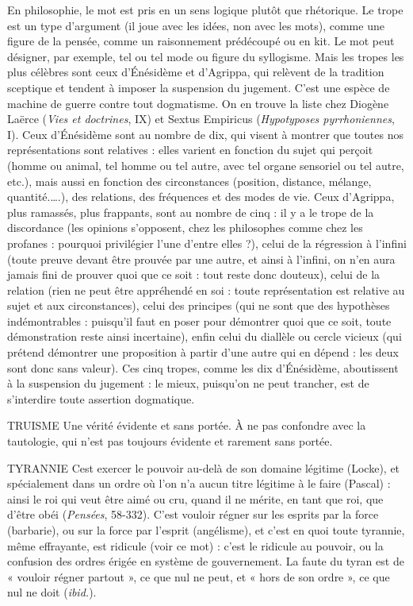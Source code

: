 En philosophie, le mot est pris en un sens logique plutôt que rhétorique. Le
trope est un type d’argument (il joue avec les idées, non avec les mots), comme
une figure de la pensée, comme un raisonnement prédécoupé ou en kit. Le mot
peut désigner, par exemple, tel ou tel mode ou figure du syllogisme. Mais les
tropes les plus célèbres sont ceux d’Énésidème et d’Agrippa, qui relèvent de la
tradition sceptique et tendent à imposer la suspension du jugement. C’est une
espèce de machine de guerre contre tout dogmatisme. On en trouve la liste
chez Diogène Laërce ({\it Vies et doctrines}, IX) et Sextus Empiricus ({\it Hypotyposes
pyrrhoniennes}, I). Ceux d’Énésidème sont au nombre de dix, qui visent à montrer
que toutes nos représentations sont relatives : elles varient en fonction du
sujet qui perçoit (homme ou animal, tel homme ou tel autre, avec tel organe
sensoriel ou tel autre, etc.), mais aussi en fonction des circonstances (position,
distance, mélange, quantité.….), des relations, des fréquences et des modes de
vie. Ceux d’Agrippa, plus ramassés, plus frappants, sont au nombre de cinq : il
y a le trope de la discordance (les opinions s'opposent, chez les philosophes
comme chez les profanes : pourquoi privilégier l’une d’entre elles ?), celui de la
régression à l'infini (toute preuve devant être prouvée par une autre, et ainsi à
l'infini, on n’en aura jamais fini de prouver quoi que ce soit : tout reste donc
douteux), celui de la relation (rien ne peut être appréhendé en soi : toute représentation
est relative au sujet et aux circonstances), celui des principes (qui ne
sont que des hypothèses indémontrables : puisqu'il faut en poser pour démontrer
quoi que ce soit, toute démonstration reste ainsi incertaine), enfin celui du
diallèle ou cercle vicieux (qui prétend démontrer une proposition à partir d’une
autre qui en dépend : les deux sont donc sans valeur). Ces cinq tropes, comme
les dix d’Énésidème, aboutissent à la suspension du jugement : le mieux,
puisqu'on ne peut trancher, est de s’interdire toute assertion dogmatique.

TRUISME Une vérité évidente et sans portée. À ne pas confondre avec la
tautologie, qui n’est pas toujours évidente et rarement sans portée.

TYRANNIE Cest exercer le pouvoir au-delà de son domaine légitime
(Locke), et spécialement dans un ordre où l’on n’a aucun titre
légitime à le faire (Pascal) : ainsi le roi qui veut être aimé ou cru, quand il ne
mérite, en tant que roi, que d’être obéi ({\it Pensées}, 58-332). C’est vouloir régner
sur les esprits par la force (barbarie), ou sur la force par l'esprit (angélisme), et
c’est en quoi toute tyrannie, même effrayante, est ridicule (voir ce mot) : c’est
le ridicule au pouvoir, ou la confusion des ordres érigée en système de gouvernement.
La faute du tyran est de « vouloir régner partout », ce que nul ne peut,
et « hors de son ordre », ce que nul ne doit ({\it ibid.}).

